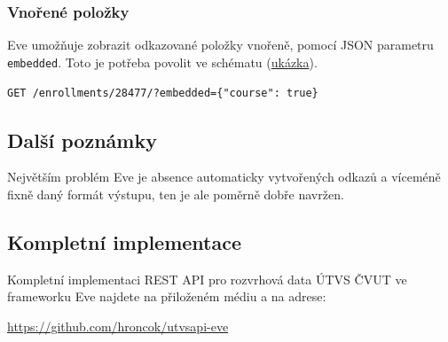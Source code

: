 \subsubsection*{Vnořené položky}\label{vnoux159enuxe9-poloux17eky}

Eve umožňuje zobrazit odkazované položky vnořeně, pomocí JSON parametru \verb!embedded!. Toto je potřeba povolit ve schématu (\protect\hyperlink{code:eve:links1}{ukázka}).

\verb!GET /enrollments/28477/?embedded={"course": true}!

\subsection{Další poznámky}\label{dalux161uxed-poznuxe1mky}

Největším problém Eve je absence automaticky vytvořených odkazů a víceméně fixně daný formát výstupu, ten je ale poměrně dobře navržen.

\subsection{Kompletní implementace}\label{kompletnuxed-implementace}

Kompletní implementaci REST API pro rozvrhová data ÚTVS ČVUT ve frameworku Eve najdete na přiloženém médiu a na adrese:

\url{https://github.com/hroncok/utvsapi-eve}
